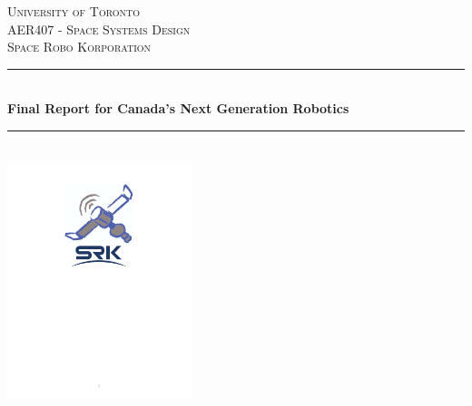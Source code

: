 \newcommand{\HRule}{\rule{\linewidth}{0.5mm}} %
\begin{titlepage}


\center %
 

\textsc{\LARGE University of Toronto}\\[1.2cm] %
\textsc{\Large AER407 - Space Systems Design}\\[0.5cm] %
\textsc{\large Space Robo Korporation}\\[0.5cm] %


\HRule \\[0.4cm]
{ \huge \bfseries Final Report for Canada's Next Generation Robotics}\\[0.5cm] %
\HRule \\[1.2cm]


\includegraphics[width=0.4\textwidth]{logo}\\[1cm] 




\end{titlepage}
